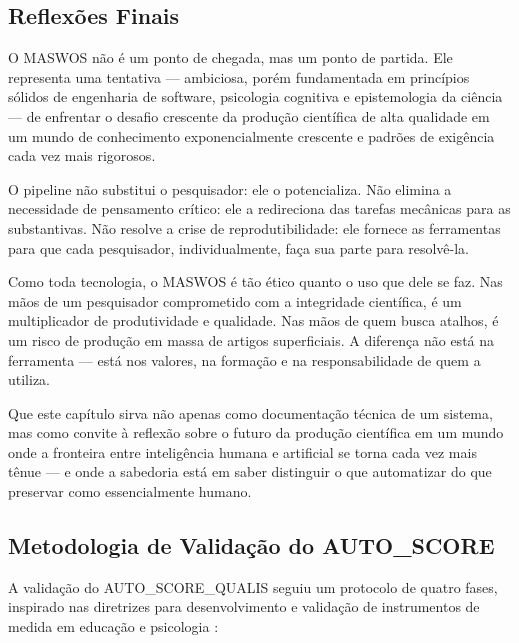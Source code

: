 \subsection{Reflexões Finais}
\label{sec:reflexoes_finais}

O MASWOS não é um ponto de chegada, mas um ponto de partida. Ele
representa uma tentativa — ambiciosa, porém fundamentada em
princípios sólidos de engenharia de software, psicologia
cognitiva e epistemologia da ciência — de enfrentar o desafio
crescente da produção científica de alta qualidade em um mundo de
conhecimento exponencialmente crescente e padrões de exigência
cada vez mais rigorosos.

O pipeline não substitui o pesquisador: ele o potencializa. Não
elimina a necessidade de pensamento crítico: ele a redireciona
das tarefas mecânicas para as substantivas. Não resolve a crise
de reprodutibilidade: ele fornece as ferramentas para que cada
pesquisador, individualmente, faça sua parte para resolvê-la.

Como toda tecnologia, o MASWOS é tão ético quanto o uso que dele
se faz. Nas mãos de um pesquisador comprometido com a integridade
científica, é um multiplicador de produtividade e qualidade. Nas
mãos de quem busca atalhos, é um risco de produção em massa de
artigos superficiais. A diferença não está na ferramenta — está
nos valores, na formação e na responsabilidade de quem a utiliza.

Que este capítulo sirva não apenas como documentação técnica de
um sistema, mas como convite à reflexão sobre o futuro da
produção científica em um mundo onde a fronteira entre
inteligência humana e artificial se torna cada vez mais tênue —
e onde a sabedoria está em saber distinguir o que automatizar do
que preservar como essencialmente humano.


\subsection{Metodologia de Validação do AUTO\_SCORE}
\label{sec:validacao_autoscore}

A validação do AUTO\_SCORE\_QUALIS seguiu um protocolo de
quatro fases, inspirado nas diretrizes para desenvolvimento e
validação de instrumentos de medida em educação e psicologia
\cite{AERA2014_Standards}:

